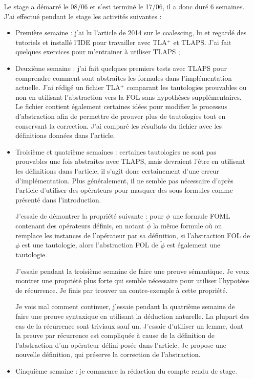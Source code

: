 \documentclass[12pt]{article}
\begin{document}
Le stage a démarré le 08/06 et s'est terminé le 17/06, il a donc duré 6 semaines.
J'ai effectué pendant le stage les activités suivantes :
\begin{itemize}
\item
  Première semaine :
  j'ai lu l'article de 2014 sur le coalescing, lu et regardé des tutoriels et installé l'IDE pour travailler avec TLA$^+$ et TLAPS. J'ai fait quelques exercices pour m'entrainer à utiliser TLAPS ;
\item
  Deuxième semaine :
  j'ai fait quelques premiers tests avec TLAPS pour comprendre comment sont abstraites les formules dans l'implémentation actuelle.
  J'ai rédigé un fichier TLA$^+$ comparant les tautologies prouvables ou non en utilisant l'abstraction vers la FOL sans hypothèses supplémentaires.
  Le fichier contient également certaines idées pour modifier le processus d'abstraction afin de permettre de prouver plus de tautologies tout en conservant la correction.
  J'ai comparé les résultats du fichier avec les définitions données dans l'article.
\item
  Troisième et quatrième semaines :
  certaines tautologies ne sont pas prouvables une fois abstraites avec TLAPS, mais devraient l'être en utilisant les définitions dans l'article, il s'agit donc certainement d'une erreur d'implémentation.
  Plus généralement, il ne semble pas nécessaire d'après l'article d'utiliser des opérateurs pour masquer des sous formules comme présenté dans l'introduction.
  
  J'essaie de démontrer la propriété suivante : pour $\phi$ une formule FOML contenant des opérateurs définis, en notant $\widetilde{\phi}$ la même formule où on remplace les instances de l'opérateur par sa définition, si l'abstraction FOL de $\phi$ est une tautologie, alors l'abstraction FOL de $\widetilde{\phi}$ est également une tautologie.

  J'essaie pendant la troisième semaine de faire une preuve sémantique.
  Je veux montrer une propriété plus forte qui semble nécessaire pour utiliser l'hypotèse de récurrence.
  Je finis par trouver un contre-exemple à cette propriété.

  Je vois mal comment continuer, j'essaie pendant la quatrième semaine de faire une preuve syntaxique en utilisant la déduction naturelle.
  La plupart des cas de la récurrence sont triviaux sauf un.
  J'essaie d'utiliser un lemme, dont la preuve par récurrence est compliquée à cause de la définition de l'abstraction d'un opérateur défini posée dans l'article.
  Je propose une nouvelle définition, qui préserve la correction de l'abstraction.
\item
  Cinquième semaine :
  je commence la rédaction du compte rendu de stage.
\end{itemize}
\end{document}
